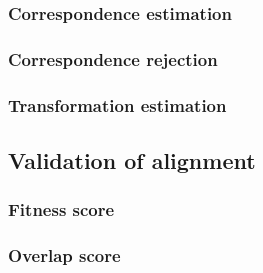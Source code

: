\subsubsection{Correspondence estimation}

\subsubsection{Correspondence rejection}

\subsubsection{Transformation estimation}

\subsection{Validation of alignment}

\subsubsection{Fitness score}

\subsubsection{Overlap score}



